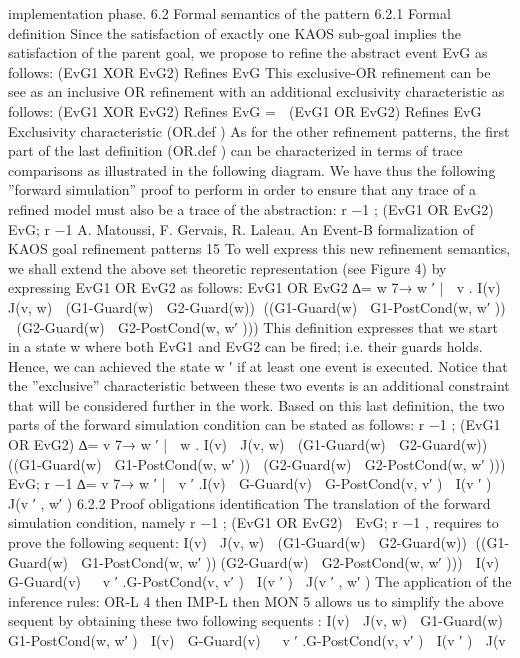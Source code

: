 implementation phase.
6.2 Formal semantics of the pattern
6.2.1 Formal definition
Since the satisfaction of exactly one KAOS sub-goal implies the satisfaction of the parent
goal, we propose to refine the abstract event EvG as follows:
(EvG1 XOR EvG2) Refines EvG
This exclusive-OR refinement can be see as an inclusive OR refinement with an additional
exclusivity characteristic as follows:
(EvG1 XOR EvG2) Refines EvG =

(EvG1 OR EvG2) Refines EvG
Exclusivity characteristic (OR.def )
As for the other refinement patterns, the first part of the last definition (OR.def ) can be
characterized in terms of trace comparisons as illustrated in the following diagram.
We have thus the following ”forward simulation” proof to perform in order to ensure that
any trace of a refined model must also be a trace of the abstraction:
r
−1
; (EvG1 OR EvG2) ⊆ EvG; r
−1
A. Matoussi, F. Gervais, R. Laleau. An Event-B formalization of KAOS goal refinement patterns 15
To well express this new refinement semantics, we shall extend the above set theoretic
representation (see Figure 4) by expressing EvG1 OR EvG2 as follows:
EvG1 OR EvG2
∆= {w 7→ w
′
| ∃ v . I(v) ∧ J(v, w) ∧ (G1-Guard(w) ∧ G2-Guard(w))∧
((G1-Guard(w) ⇒ G1-PostCond(w, w′
)) ∨ (G2-Guard(w) ⇒ G2-PostCond(w, w′
)))}
This definition expresses that we start in a state w where both EvG1 and EvG2 can be
fired; i.e. their guards holds. Hence, we can achieved the state w
′
if at least one event is
executed. Notice that the ”exclusive” characteristic between these two events is an additional
constraint that will be considered further in the work. Based on this last definition, the two
parts of the forward simulation condition can be stated as follows:
r
−1
; (EvG1 OR EvG2) ∆= {v 7→ w
′
| ∃ w . I(v) ∧ J(v, w) ∧ (G1-Guard(w) ∧ G2-Guard(w))∧
((G1-Guard(w) ⇒ G1-PostCond(w, w′
)) ∨ (G2-Guard(w) ⇒ G2-PostCond(w, w′
)))}
EvG; r
−1 ∆= {v 7→ w
′
| ∃ v
′
.I(v) ∧ G-Guard(v) ∧ G-PostCond(v, v′
) ∧ I(v
′
) ∧ J(v
′
, w′
) }
6.2.2 Proof obligations identification
The translation of the forward simulation condition, namely r
−1
; (EvG1 OR EvG2) ⊆
EvG; r
−1
, requires to prove the following sequent:
I(v) ∧ J(v, w) ∧ (G1-Guard(w) ∧ G2-Guard(w))∧
((G1-Guard(w) ⇒ G1-PostCond(w, w′
))∨(G2-Guard(w) ⇒ G2-PostCond(w, w′
)))
⊢
I(v) ∧ G-Guard(v) ∧ ∃ v
′
.G-PostCond(v, v′
) ∧ I(v
′
) ∧ J(v
′
, w′
)
The application of the inference rules: OR-L 4
then IMP-L then MON 5 allows us to simplify
the above sequent by obtaining these two following sequents :
I(v) ∧ J(v, w) ∧ G1-Guard(w) ∧ G1-PostCond(w, w′
)
⊢
I(v) ∧ G-Guard(v) ∧ ∃ v
′
.G-PostCond(v, v′
) ∧ I(v
′
) ∧ J(v
